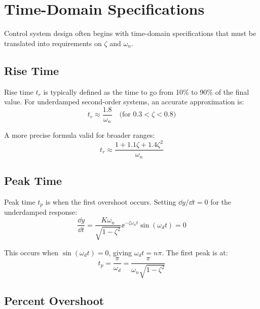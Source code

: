 \section{Time-Domain Specifications}
\label{sec:time_specs}

Control system design often begins with time-domain specifications that must be translated into requirements on $\zeta$ and $\omega_n$.

\subsection{Rise Time}

Rise time $t_r$ is typically defined as the time to go from 10\% to 90\% of the final value. For underdamped second-order systems, an accurate approximation is:
\begin{equation}
\boxed{t_r \approx \frac{1.8}{\omega_n}} \quad \text{(for } 0.3 < \zeta < 0.8\text{)}
\end{equation}

A more precise formula valid for broader ranges:
\begin{equation}
t_r \approx \frac{1 + 1.1\zeta + 1.4\zeta^2}{\omega_n}
\end{equation}

\subsection{Peak Time}

Peak time $t_p$ is when the first overshoot occurs. Setting $\dd y/\dd t = 0$ for the underdamped response:
\begin{equation}
\frac{\dd y}{\dd t} = \frac{K\omega_n}{\sqrt{1-\zeta^2}}\ee^{-\zeta\omega_n t}\sin(\omega_d t) = 0
\end{equation}

This occurs when $\sin(\omega_d t) = 0$, giving $\omega_d t = n\pi$. The first peak is at:
\begin{equation}
\boxed{t_p = \frac{\pi}{\omega_d} = \frac{\pi}{\omega_n\sqrt{1-\zeta^2}}}
\label{eq:peak_time}
\end{equation}

\subsection{Percent Overshoot}

